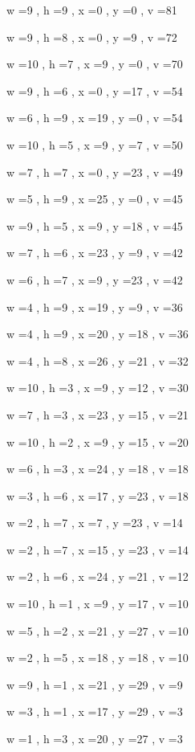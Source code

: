 \documentclass[11pt]{article}
\begin{document}


w =9 , h =9 , x =0 , y =0 , v =81
\par
w =9 , h =8 , x =0 , y =9 , v =72
\par
w =10 , h =7 , x =9 , y =0 , v =70
\par
w =9 , h =6 , x =0 , y =17 , v =54
\par
w =6 , h =9 , x =19 , y =0 , v =54
\par
w =10 , h =5 , x =9 , y =7 , v =50
\par
w =7 , h =7 , x =0 , y =23 , v =49
\par
w =5 , h =9 , x =25 , y =0 , v =45
\par
w =9 , h =5 , x =9 , y =18 , v =45
\par
w =7 , h =6 , x =23 , y =9 , v =42
\par
w =6 , h =7 , x =9 , y =23 , v =42
\par
w =4 , h =9 , x =19 , y =9 , v =36
\par
w =4 , h =9 , x =20 , y =18 , v =36
\par
w =4 , h =8 , x =26 , y =21 , v =32
\par
w =10 , h =3 , x =9 , y =12 , v =30
\par
w =7 , h =3 , x =23 , y =15 , v =21
\par
w =10 , h =2 , x =9 , y =15 , v =20
\par
w =6 , h =3 , x =24 , y =18 , v =18
\par
w =3 , h =6 , x =17 , y =23 , v =18
\par
w =2 , h =7 , x =7 , y =23 , v =14
\par
w =2 , h =7 , x =15 , y =23 , v =14
\par
w =2 , h =6 , x =24 , y =21 , v =12
\par
w =10 , h =1 , x =9 , y =17 , v =10
\par
w =5 , h =2 , x =21 , y =27 , v =10
\par
w =2 , h =5 , x =18 , y =18 , v =10
\par
w =9 , h =1 , x =21 , y =29 , v =9
\par
w =3 , h =1 , x =17 , y =29 , v =3
\par
w =1 , h =3 , x =20 , y =27 , v =3
\par
\newpage
\end{document}
